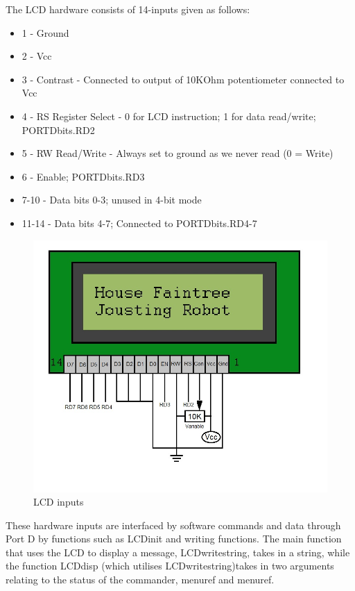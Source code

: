 \documentclass{article}
\begin{document}
The LCD hardware consists of 14-inputs given as follows:
\begin{itemize}
	\item 1 - Ground
	\item 2 - Vcc
	\item 3 - Contrast - Connected to output of 10KOhm potentiometer connected to Vcc
	\item 4 - RS Register Select - 0 for LCD instruction; 1 for data read/write; PORTDbits.RD2
	\item 5 - RW Read/Write - Always set to ground as we never read (0 = Write)
	\item 6 - Enable; PORTDbits.RD3
	\item 7-10 - Data bits 0-3; unused in 4-bit mode
	\item 11-14 - Data bits 4-7; Connected to PORTDbits.RD4-7
\end{itemize}
\begin{figure}[H]
		
	\includegraphics[scale=0.45]{LCD.jpg}
	\centering
	\caption{LCD inputs}
\end{figure}
	These hardware inputs are interfaced by software commands and data through Port D by functions such as LCD\textunderscore init and writing functions.
	The main function that uses the LCD to display a message, LCD\textunderscore write\textunderscore string, takes in a string, while the function LCD\textunderscore disp (which utilises LCD\textunderscore write\textunderscore string)takes in two arguments relating to the status of the commander, menu\textunderscore ref and menu\textunderscore ref. 
\end{document}
